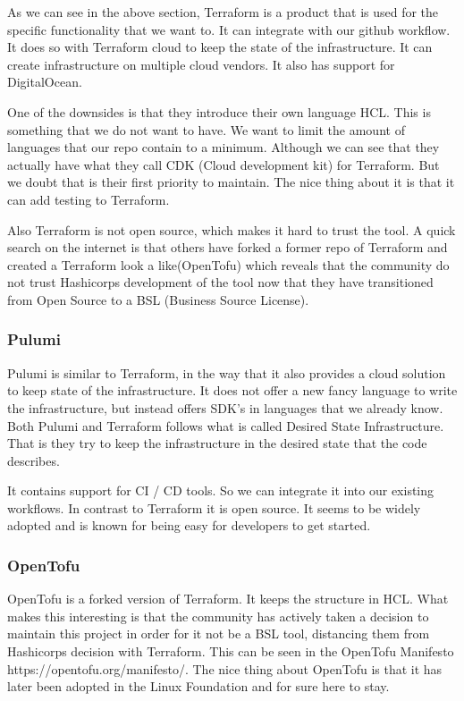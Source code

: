 As we can see in the above section, Terraform is a product that is used for the specific functionality that we want to. It can integrate with our github workflow. It does so with Terraform cloud to keep the state of the infrastructure. It can create infrastructure on multiple cloud vendors. It also has support for DigitalOcean.

One of the downsides is that they introduce their own language HCL. This is something that we do not want to have. We want to limit the amount of languages that our repo contain to a minimum. Although we can see that they actually have what they call CDK (Cloud development kit) for Terraform. But we doubt that is their first priority to maintain. The nice thing about it is that it can add testing to Terraform.

Also Terraform is not open source, which makes it hard to trust the tool. A quick search on the internet is that others have forked a former repo of Terraform and created a Terraform look a like(OpenTofu) which reveals that the community do not trust Hashicorps development of the tool now that they have transitioned from Open Source to a BSL (Business Source License).

\subsubsection{Pulumi}

Pulumi is similar to Terraform, in the way that it also provides a cloud solution to keep state of the infrastructure. It does not offer a new fancy language to write the infrastructure, but instead offers SDK's in languages that we already know. Both Pulumi and Terraform follows what is called Desired State Infrastructure. That is they try to keep the infrastructure in the desired state that the code describes.

It contains support for CI / CD tools. So we can integrate it into our existing workflows. In contrast to Terraform it is open source. It seems to be widely adopted and is known for being easy for developers to get started.

\subsubsection{OpenTofu}

OpenTofu is a forked version of Terraform. It keeps the structure in HCL. What makes this interesting is that the community has actively taken a decision to maintain this project in order for it not be a BSL tool, distancing them from Hashicorps decision with Terraform. This can be seen in the OpenTofu Manifesto https://opentofu.org/manifesto/. The nice thing about OpenTofu is that it has later been adopted in the Linux Foundation and for sure here to stay.

